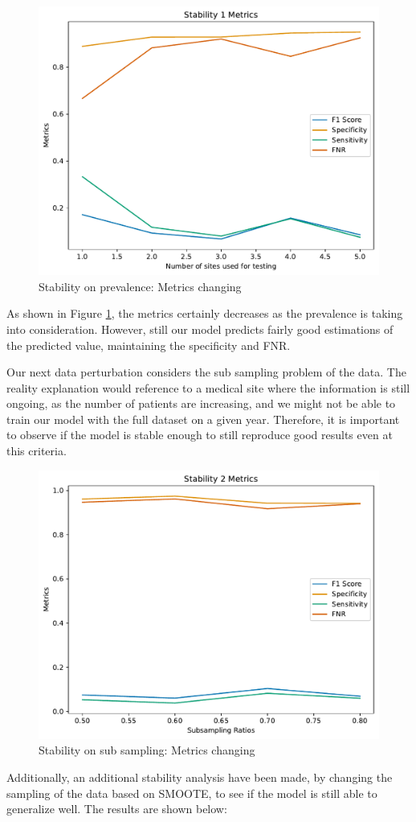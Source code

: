 \documentclass[10pt,letterpaper]{article}
\begin{document}
\begin{figure}[H]
    \centering
    \includegraphics[width=0.5\linewidth]{../plots/tabpfn_stability1_metrics.pdf}
    \caption{Stability on prevalence: Metrics changing}
    \label{fig:stab-1}
\end{figure}

As shown in Figure \ref{fig:stab-1}, the metrics certainly decreases as the prevalence is taking into consideration. However, still our model predicts fairly good estimations of the predicted value, maintaining the specificity and FNR.

Our next data perturbation considers the sub sampling problem of the data. The reality explanation would reference to a medical site where the information is still ongoing, as the number of patients are increasing, and we might not be able to train our model with the full dataset on a given year. 
Therefore, it is important to observe if the model is stable enough to still reproduce good results even at this criteria. 

\begin{figure}[H]
    \centering
    \includegraphics[width=0.5\linewidth]{../plots/tabpfn_stability2_metrics.pdf}
    \caption{Stability on sub sampling: Metrics changing}
    \label{fig:enter-label}
\end{figure}

Additionally, an additional stability analysis have been made, by changing the sampling of the data based on SMOOTE, to see if the model is 
still able to generalize well. The results are shown below:
\end{document}
